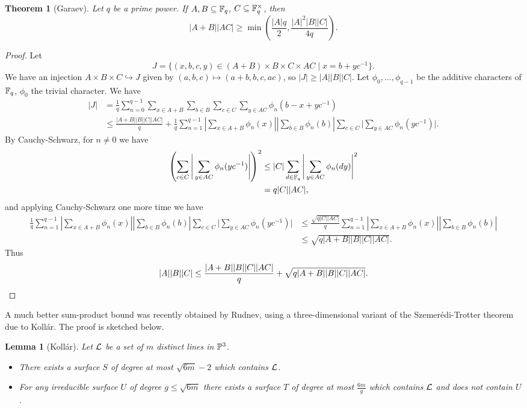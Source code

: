 \documentclass[letterpaper,11pt]{article}
\newtheorem{thm}{Theorem}
\newtheorem{lem}{Lemma}
\theoremstyle{definition}
\theoremstyle{remark}
\begin{document}
\begin{thm}[Garaev] Let $q$ be a prime power. If $A,B\subseteq \mathbb{F}_q$, $C \subseteq \mathbb{F}_q^\times$, then
\[
|A+B||AC| \ge \min\left(\frac{|A|q}{2},\frac{|A|^2|B||C|}{4q}\right).
\]
\end{thm}
\begin{proof} Let
\[
J = \{(x,b,c,y)\in (A+B)\times B \times C\times AC\mid x = b + yc^{-1}\}.
\]
We have an injection $A\times B\times C\hookrightarrow J$ given by $(a,b,c)\mapsto (a+b,b,c,ac)$, so $|J| \ge |A||B||C|$. Let $\phi_0, ..., \phi_{q-1}$ be the additive characters of $\mathbb{F}_q$, $\phi_0$ the trivial character. We have
\begin{align*}
|J| &= \frac{1}{q}\sum_{n=0}^{q-1}\sum_{x\in A+B}\sum_{b\in B}\sum_{c\in C}\sum_{y\in AC} \phi_n(b-x+yc^{-1})\\
&\le \frac{|A+B||B||C||AC|}{q} + \frac{1}{q}\sum_{n=1}^{q-1}\left|\sum_{x\in A+B}\phi_n(x)\right|\left|\sum_{b\in B}\phi_n(b)\right|\sum_{c\in C}\Bigg|\sum_{y\in AC}\phi_n(yc^{-1})\Bigg|.
\end{align*}
By Cauchy-Schwarz, for $n \ne 0$ we have
\begin{align*}
\left(\sum_{c\in C}\Bigg|\sum_{y\in AC}\phi_n(yc^{-1})\Bigg|\right)^2 &\le |C|\sum_{d\in \mathbb{F}_q}\Bigg|\sum_{y\in AC} \phi_n(dy)\Bigg|^2\\
&= q|C||AC|,
\end{align*}
and applying Cauchy-Schwarz one more time we have
\begin{align*}
\frac{1}{q}\sum_{n=1}^{q-1}\left|\sum_{x\in A+B}\phi_n(x)\right|\left|\sum_{b\in B}\phi_n(b)\right|\sum_{c\in C}\Bigg|\sum_{y\in AC}\phi_n(yc^{-1})\Bigg| &\le \frac{\sqrt{q|C||AC|}}{q}\sum_{n=1}^{q-1}\left|\sum_{x\in A+B}\phi_n(x)\right|\left|\sum_{b\in B}\phi_n(b)\right|\\
&\le \sqrt{q|A+B||B||C||AC|}.
\end{align*}
Thus
\[
|A||B||C| \le \frac{|A+B||B||C||AC|}{q} + \sqrt{q|A+B||B||C||AC|}.\qedhere
\]
\end{proof}

A much better sum-product bound was recently obtained by Rudnev, using a three-dimensional variant of the Szemer\'edi-Trotter theorem due to Koll\'ar. The proof is sketched below.

\begin{lem}[Koll\'ar]\label{dimension} Let $\mathcal{L}$ be a set of $m$ distinct lines in $\mathbb{P}^3$.
\begin{itemize}
\item[1)] There exists a surface $S$ of degree at most $\sqrt{6m}-2$ which contains $\mathcal{L}$.
\item[2)] For any irreducible surface $U$ of degree $g \le \sqrt{6m}$ there exists a surface $T$ of degree at most $\frac{6m}{g}$ which contains $\mathcal{L}$ and does not contain $U$.
\end{itemize}
\end{lem}
\end{document}
